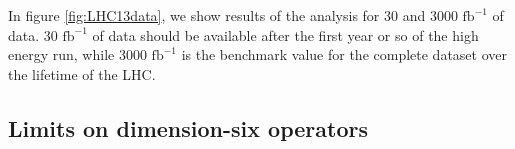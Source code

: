 \documentclass[preprint]{JHEP3} %
\def\invfb {\mathrm{fb}^{-1}}
\begin{document}
In figure \ref{fig:LHC13data}, we show results of the analysis for 30 and 3000 $\invfb$ of data. 30 $\invfb$ of data should be available after 
the first year or so of the high energy run, while 3000 $\invfb$ is the benchmark value for the complete dataset over the lifetime of the LHC. 





\subsection{Limits on dimension-six operators}
\end{document}
